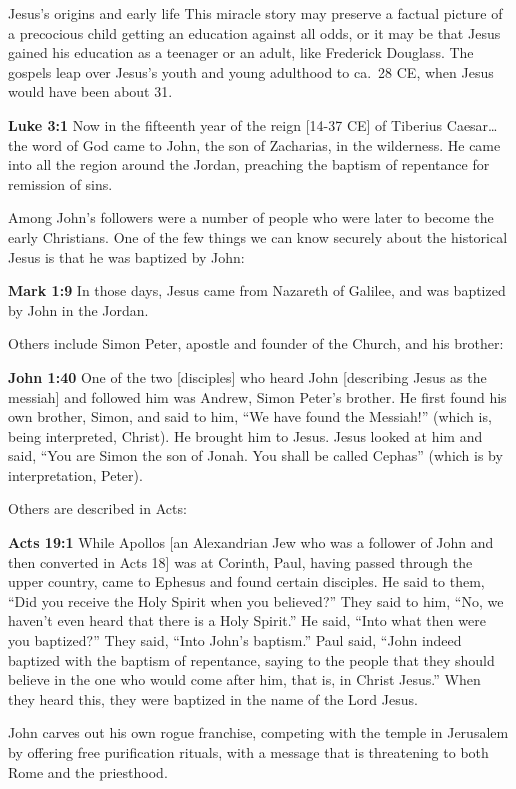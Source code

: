 \documentclass[10pt,twoside]{book}
\newcommand{\quotesize}{\normalsize{}}
\newcommand{\comm}[1]{\begingroup \color{black!50} #1\endgroup}
\newenvironment{quotetext}{\begingroup\quotesize}{\endgroup}
\newcommand{\bible}[2]{\begin{quotetext}\textbf{#1} #2\end{quotetext}}
\newcommand{\gospelmark}[2]{\bible{Mark #1}{#2}}
\newcommand{\luke}[2]{\bible{Luke #1}{#2}}
\newcommand{\john}[2]{\bible{John #1}{#2}}
\begin{document}
\begin{section}{Jesus's origins and early life}
\comm{
This miracle story may preserve a factual picture of a precocious child getting an education against all odds, or
it may be that Jesus gained his education as a teenager or an adult, like Frederick Douglass. The gospels leap
over Jesus's youth and young adulthood to ca.~28 CE, when Jesus would have been about 31.
}

\luke{3:1}{Now in the fifteenth year of the reign [14-37 CE] of Tiberius
Caesar\ldots the word of God came to John, the son of Zacharias, in
the wilderness.  He came into all the region around the Jordan,
preaching the baptism of repentance for remission of sins.}

\comm{
Among John's followers were a number of people who were later to become the early Christians.
One of the few things we can know securely about the historical Jesus is that he was baptized
by John:
}

\gospelmark{1:9}{In those days, Jesus came from Nazareth of Galilee, and was baptized by John in the Jordan.}

\comm{Others include Simon Peter, apostle and founder of the Church, and his brother:}

\john{1:40}{One of the two [disciples] who heard John [describing 
Jesus as the messiah] and followed him was Andrew, Simon Peter’s
brother. He first found his own brother, Simon, and said to him, “We
have found the Messiah!” (which is, being interpreted, Christ). He
brought him to Jesus. Jesus looked at him and said, “You are Simon the
son of Jonah. You shall be called Cephas” (which is by interpretation,
Peter).}

\comm{Others are described in Acts:}

\bible{Acts 19:1}{While Apollos [an Alexandrian Jew who was a follower of John and then converted in Acts 18] was at Corinth, Paul, having passed through the upper country, came to Ephesus and found certain disciples. He said to them, “Did you receive the Holy Spirit when you believed?”
They said to him, ``No, we haven’t even heard that there is a Holy Spirit.''
 He said, ``Into what then were you baptized?''
They said, ``Into John’s baptism.''
 Paul said, ``John indeed baptized with the baptism of repentance, saying to the people that they should believe in the one who would come after him, that is, in Christ Jesus.''
 When they heard this, they were baptized in the name of the Lord Jesus.}

\comm{
John carves out his own rogue franchise, competing with the temple in Jerusalem by
offering free purification rituals, with a message that is threatening to both Rome and the priesthood.
}


\end{section}
\end{document}

